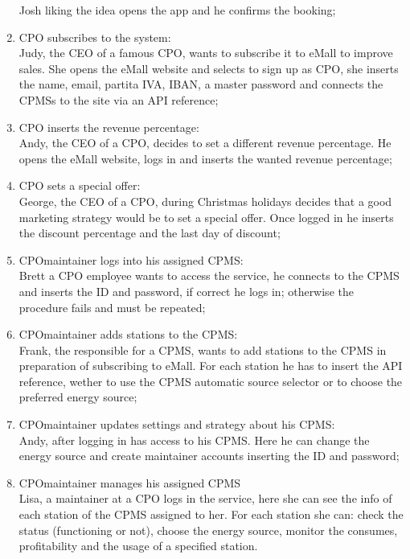 \begin{enumerate}[label=\textbf{S\arabic*}]
            Josh liking the idea opens the app and he confirms the booking;\label{SCE:user-gets-suggestions}
      \item \ac{CPO} subscribes to the system:\\
            Judy, the CEO of a famous \ac{CPO}, wants to subscribe it to \ac{eMall} to improve sales.
            She opens the eMall website and selects to sign up as \ac{CPO}, she inserts the name, email, \gls{partita IVA}, \ac{IBAN}, a master password and connects the \acp{CPMS} to the site via an \ac{API} reference;\label{SCE:cpo-signs-up}
      \item \ac{CPO} inserts the revenue percentage:\\
            Andy, the CEO of a \ac{CPO}, decides to set a different revenue percentage. He opens the eMall website, logs in and inserts the wanted revenue percentage;\label{SCE:cpo-sets-revenue-percentage}
      \item \ac{CPO} sets a special offer:\\
            George, the CEO of a \ac{CPO}, during Christmas holidays decides that a good marketing strategy would be to set a special offer. Once logged in he inserts the discount percentage and the last day of discount; \label{SCE:cpo-sets-special-offer}
      \item \ac{CPO}maintainer logs into his assigned \ac{CPMS}:\\
            Brett a \ac{CPO} employee wants to access the service, he connects to the \ac{CPMS} and inserts the ID
            and password, if correct he logs in; otherwise the procedure fails and must be repeated;\label{SCE:cpomaintainer-logs-in}
      \item \ac{CPO}maintainer adds stations to the \ac{CPMS}:\\
            Frank, the responsible for a \ac{CPMS}, wants to add stations to the \ac{CPMS} in preparation of subscribing to eMall. For each station he has to insert the \ac{API} reference,
            wether to use the \ac{CPMS} automatic source selector or to choose the preferred energy source;\label{SCE:cpomaintainer-adds-stations}
      \item \ac{CPO}maintainer updates settings and strategy about his \ac{CPMS}:\\
            Andy, after logging in has access to his \ac{CPMS}.
            Here he can change the energy source and create maintainer accounts inserting the ID and password;\label{SCE:cpomaintainer-updates-settings}
      \item \ac{CPO}maintainer manages his assigned \ac{CPMS}\\
            Lisa, a maintainer at a \ac{CPO} logs in the service, here she can see the info of each station of the \ac{CPMS} assigned to her.
            For each station she can: check the status (functioning or not), choose the energy source, monitor the consumes, profitability and the usage of a specified station.\label{SCE:cpomaintainer-manages}
\end{enumerate}

